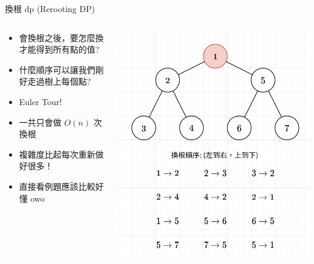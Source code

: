 \documentclass[aspectratio=169]{beamer}
\begin{document}
    \begin{frame}{換根 dp (Rerooting DP)}
        \begin{columns}
            \begin{column}{0.6 \textwidth}
                \begin{itemize}
                    \item 會換根之後，要怎麼換才能得到所有點的值?
                    \item<2-> 什麼順序可以讓我們剛好走過樹上每個點?
                    \item<3-> Euler Tour!
                    \item<4-> 一共只會做 $O(n)$ 次換根
                    \item<4-> 複雜度比起每次重新做好很多！
                    \item<5-> 直接看例題應該比較好懂 owo
                \end{itemize}
            \end{column}
            \begin{column}{0.4 \textwidth}
                \begin{center}
                    \includegraphics[scale=0.35]{images/reroot_order.png}
                \end{center}
            \end{column}
        \end{columns}
    \end{frame}
    
\end{document}
